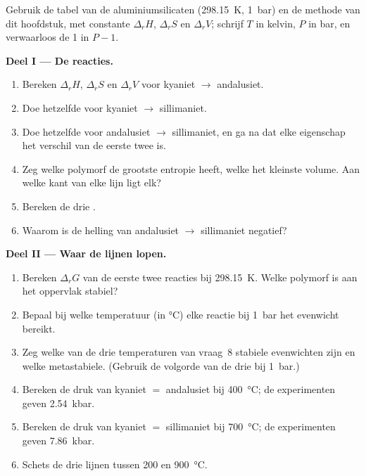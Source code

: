 \begin{problem}
\label{pb:b2:metamorphic-facies:1}
Gebruik de tabel van de aluminiumsilicaten (\qty{298.15}{K}, \qty{1}{bar}) en de methode van
dit hoofdstuk, met constante $\Delta_r H$, $\Delta_r S$ en $\Delta_r V$; schrijf $T$ in
kelvin, $P$ in bar, en verwaarloos de 1 in $P - 1$.

\noindent\textbf{Deel I --- De reacties.}
\begin{enumerate}
\item Bereken $\Delta_r H$, $\Delta_r S$ en $\Delta_r V$ voor kyaniet $\to$ andalusiet.
\item Doe hetzelfde voor kyaniet $\to$ sillimaniet.
\item Doe hetzelfde voor andalusiet $\to$ sillimaniet, en ga na dat elke eigenschap het
verschil van de eerste twee is.
\item Zeg welke polymorf de grootste entropie heeft, welke het kleinste volume. Aan welke kant
van elke lijn ligt elk?
\item Bereken de drie .
\item Waarom is de helling van andalusiet $\to$ sillimaniet negatief?
\end{enumerate}

\noindent\textbf{Deel II --- Waar de lijnen lopen.}
\begin{enumerate}[resume]
\item Bereken $\Delta_r G$ van de eerste twee reacties bij \qty{298.15}{K}. Welke
polymorf is aan het oppervlak stabiel?
\item Bepaal bij welke temperatuur (in \unit{\celsius}) elke reactie bij \qty{1}{bar} het evenwicht
bereikt.
\item Zeg welke van de drie temperaturen van vraag~8 stabiele evenwichten zijn en welke
metastabiele. (Gebruik de volgorde van de drie bij \qty{1}{bar}.)
\item Bereken de druk van kyaniet $=$ andalusiet bij \qty{400}{\celsius}; de
experimenten geven \qty{2.54}{kbar}.
\item Bereken de druk van kyaniet $=$ sillimaniet bij \qty{700}{\celsius}; de
experimenten geven \qty{7.86}{kbar}.
\item Schets de drie lijnen tussen 200 en \qty{900}{\celsius}.
\end{enumerate}


\end{problem}
